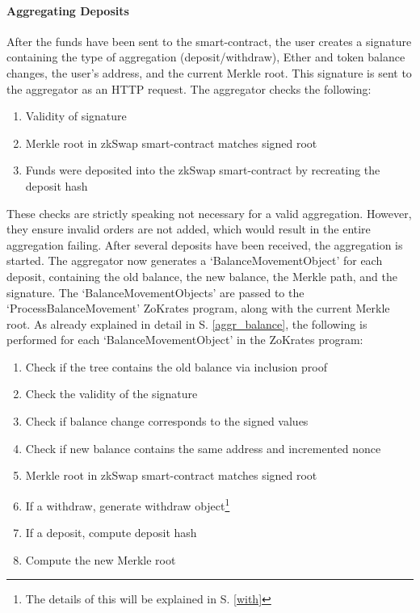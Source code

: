 \documentclass[../../thesis.tex]{subfiles}
\begin{document}
\paragraph{Aggregating Deposits} \label{aggr_deps}
After the funds have been sent to the smart-contract, the user creates a signature containing the type of aggregation (deposit/withdraw), Ether and token balance changes, the user's address, and the current Merkle root. This signature is sent to the aggregator as an HTTP request. The aggregator checks the following: 

\begin{enumerate}
    \item Validity of signature
    \item Merkle root in zkSwap smart-contract matches signed root
    \item Funds were deposited into the zkSwap smart-contract by recreating the deposit hash
\end{enumerate}

These checks are strictly speaking not necessary for a valid aggregation. However, they ensure invalid orders are not added, which would result in the entire aggregation failing. After several deposits have been received, the aggregation is started. The aggregator now generates a `BalanceMovementObject' for each deposit, containing the old balance, the new balance, the Merkle path, and the signature. The `BalanceMovementObjects' are passed to the `ProcessBalanceMovement' ZoKrates program, along with the current Merkle root. As already explained in detail in S. \ref{aggr_balance}, the following is performed for each `BalanceMovementObject' in the ZoKrates program:

\begin{enumerate}
    \item Check if the tree contains the old balance via inclusion proof
    \item Check the validity of the signature
    \item Check if balance change corresponds to the signed values
    \item Check if new balance contains the same address and incremented nonce
    \item Merkle root in zkSwap smart-contract matches signed root
    \item If a withdraw, generate withdraw object\footnote{The details of this will be explained in S. \ref{with}}
    \item If a deposit, compute deposit hash
    \item Compute the new Merkle root
\end{enumerate}
\end{document}
